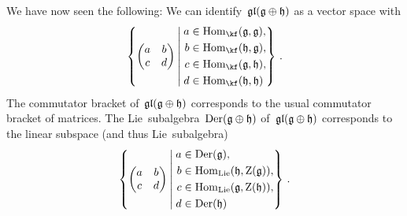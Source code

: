 \begin{example}
  We have now seen the following:
  We can identify~$\mathfrak{gl}( \mathfrak{g} \oplus \mathfrak{h})$ as a vector space with
  \[
    \left\{
      \begin{pmatrix}
        a & b \\
        c & d
      \end{pmatrix}
    \suchthat*
      \begin{aligned}
        a &\in \Hom_{\kf}(\glie, \glie),  \\
        b &\in \Hom_{\kf}(\hlie, \glie),  \\
        c &\in \Hom_{\kf}(\glie, \hlie),  \\
        d &\in \Hom_{\kf}(\hlie, \hlie)   \\
      \end{aligned}
    \right\} \,.
  \]
  The commutator bracket of~$\mathfrak{gl}( \mathfrak{g} \oplus \mathfrak{h} )$ corresponds to the usual commutator bracket of matrices.
  The Lie~subalgebra~$\operatorname{Der}(\mathfrak{g} \oplus \mathfrak{h})$ of~$\mathfrak{gl}( \mathfrak{g} \oplus \mathfrak{h} )$ corresponds to the linear subspace (and thus Lie~subalgebra)
  \[
    \left\{
      \begin{pmatrix}
        a & b \\
        c & d
      \end{pmatrix}
    \suchthat*
      \begin{aligned}
        a &\in \Der(\glie),                           \\
        b &\in \Hom_{\Lie}(\hlie, \centerlie(\glie)), \\
        c &\in \Hom_{\Lie}(\glie, \centerlie(\hlie)), \\
        d &\in \Der(\hlie)
      \end{aligned}
    \right\} \,.
  \]
\end{example}


